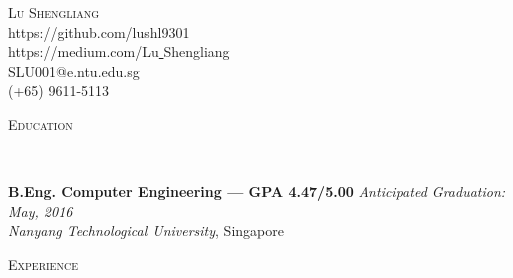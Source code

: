 \documentclass[9pt]{article}
\newenvironment{changemargin}[2]{%
  \begin{list}{}{%
      \setlength{\topsep}{0pt}%
      \setlength{\leftmargin}{#1}%
      \setlength{\rightmargin}{#2}%
      \setlength{\listparindent}{\parindent}%
      \setlength{\itemindent}{\parindent}%
      \setlength{\parsep}{\parskip}%
    }%
  \item[]}{\end{list}
}
\newcommand{\lineover}{
  \begin{changemargin}{-0.05in}{-0.05in}
    \vspace*{-8pt}
    \hrulefill \\
    \vspace*{-2pt}
  \end{changemargin}
}
\newcommand{\header}[1]{
  \begin{changemargin}{-0.5in}{-0.5in}
    \scshape{#1}\\
    \lineover
  \end{changemargin}
}
\newcommand{\contact}[5]{
  \begin{changemargin}{-0.5in}{-0.5in}
    \begin{center}
      {\Large \scshape {#1}}\\ \smallskip
      {#2}\\ \smallskip 
      {#3}\\ \smallskip
      {#4}\\ \smallskip
      {#5}\smallskip
    \end{center}
  \end{changemargin}
}
\newenvironment{body}
{
\vspace*{-16pt}
\begin{changemargin}{-0.25in}{-0.5in}
}	
{
\end{changemargin}
}
\begin{document}
\contact{Lu Shengliang}{https://github.com/lushl9301}{https://medium.com/Lu\underline{ }Shengliang}{SLU001@e.ntu.edu.sg}{(+65) 9611-5113}


%
%
%
%
\header{Education}

\begin{body}
  \vspace{14pt}
  \textbf{B.Eng. Computer Engineering --- GPA 4.47/5.00} \hfill \emph{Anticipated Graduation: May, 2016} \\
  \emph{Nanyang Technological University}, Singapore\\
\end{body}

\smallskip


\header{Experience}
\end{document}
